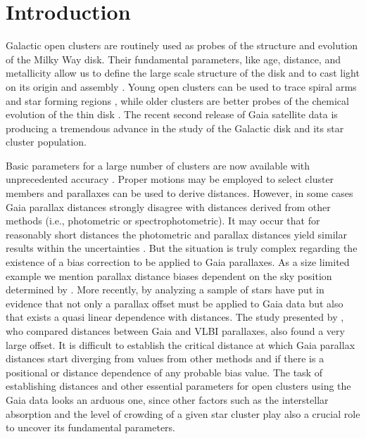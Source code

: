 \documentclass[draft]{aa}
\begin{document}
\maketitle




\section{Introduction}

Galactic open clusters are routinely used as probes of the structure and
evolution of the Milky Way disk. Their fundamental parameters, like age,
distance, and metallicity allow us to define the large scale structure of the
disk and to cast light on its origin and assembly \citep{Janes_1982,
Moitinho_2010,2018A&A...618A..93C}. Young open clusters can be used to trace
spiral arms and star forming regions \citep{Moitinho_2006,Vazquez2008}, while
older clusters are better probes of the chemical evolution of the thin disk
\citep{2009yCat..35120063M}. The recent second release of Gaia satellite data
\citep{GaiaDR2_2018} is producing a tremendous advance in the study of the
Galactic disk and its star cluster population.

Basic parameters for a large number of clusters are now available with
unprecedented accuracy \citep{2018A&A...618A..93C,Soubiran_2018,Bossini_2019}.
Proper motions may be employed to select cluster members and parallaxes can be
used to derive distances. However, in some cases Gaia parallax distances
strongly disagree with distances derived from other methods 
(i.e., photometric or spectrophotometric). It may occur that for reasonably
short distances the photometric and parallax distances yield similar results
within the uncertainties \citep{2018A&A...618A..93C}. But the situation is
truly complex regarding the existence of a bias correction to be applied to
Gaia parallaxes. As a size limited example we mention parallax distance biases
dependent on the sky position determined by \cite{Lindegren_2018}. More
recently, by analyzing a sample of stars \cite{Schonrich2019} have put in
evidence that not only a parallax offset must be applied to Gaia data but also
that exists a quasi linear dependence with distances. The study presented by 
\cite{Xu_2019}, who compared distances between Gaia and VLBI parallaxes, also
found a very large offset.
It is difficult to establish the critical distance at which Gaia parallax
distances start diverging from values from other methods and if there is a
positional or distance dependence of any probable bias value. The  task of
establishing distances and other essential parameters for open clusters using
the Gaia data looks an arduous one, since other factors such as the
interstellar absorption and the level of crowding of a given star cluster play
also a crucial role to uncover its fundamental parameters.
\end{document}
